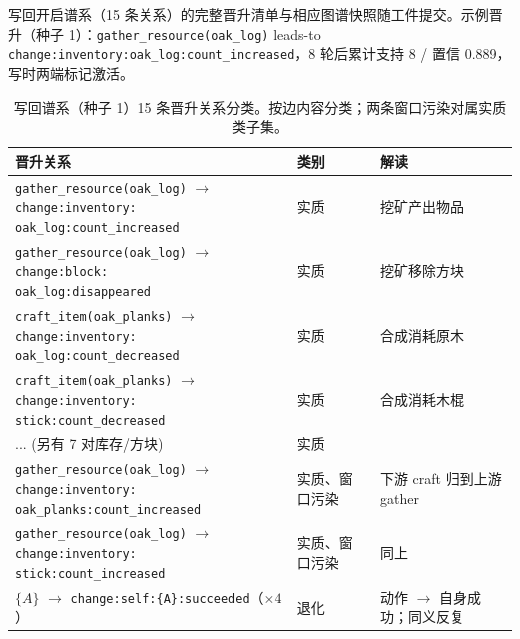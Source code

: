 \documentclass[10pt,a4paper]{ctexart}
\begin{document}
写回开启谱系（15 条关系）的完整晋升清单与相应图谱快照随工件提交。示例晋升（种子 1）：\texttt{gather\_resource(oak\_log)} leads-to \texttt{change:inventory:oak\_log:count\_increased}，8 轮后累计支持 8 / 置信 0.889，写时两端标记激活。

\begin{table}[h]
\centering\small
\caption{写回谱系（种子 1）15 条晋升关系分类。按边内容分类；两条窗口污染对属实质类子集。}
\label{tab:s-taxonomy}
\begin{tabular}{L{6.6cm}L{2.2cm}L{5.2cm}}
\toprule
\textbf{晋升关系} & \textbf{类别} & \textbf{解读} \\
\midrule
\texttt{gather\_resource(oak\_log)} $\rightarrow$ \texttt{change:inventory:\newline oak\_log:count\_increased} & 实质 & 挖矿产出物品 \\
\texttt{gather\_resource(oak\_log)} $\rightarrow$ \texttt{change:block:\newline oak\_log:disappeared} & 实质 & 挖矿移除方块 \\
\texttt{craft\_item(oak\_planks)} $\rightarrow$ \texttt{change:inventory:\newline oak\_log:count\_decreased} & 实质 & 合成消耗原木 \\
\texttt{craft\_item(oak\_planks)} $\rightarrow$ \texttt{change:inventory:\newline stick:count\_decreased} & 实质 & 合成消耗木棍 \\
... (另有 7 对库存/方块) & 实质 & \\
\midrule
\texttt{gather\_resource(oak\_log)} $\rightarrow$ \texttt{change:inventory:\newline oak\_planks:count\_increased} & 实质、窗口污染 & 下游 craft 归到上游 gather \\
\texttt{gather\_resource(oak\_log)} $\rightarrow$ \texttt{change:inventory:\newline stick:count\_increased} & 实质、窗口污染 & 同上 \\
\midrule
\texttt{$\{A\}$} $\rightarrow$ \texttt{change:self:\{A\}:succeeded}（$\times 4$） & 退化 & 动作 $\rightarrow$ 自身成功；同义反复 \\
\bottomrule
\end{tabular}
\end{table}
\end{document}
